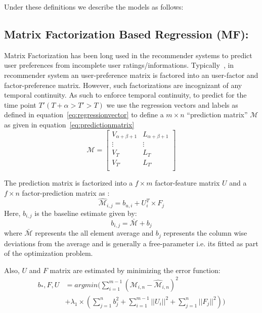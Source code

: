 Under these definitions we describe the models as follows:
\subsection{\label{sec:model:matrixfactor} Matrix Factorization Based Regression (MF):}
Matrix Factorization has been long used in the recommender systems to predict user 
preferences from incomplete user ratings/informations. Typically~\cite{canny2002factor},
in recommender system an user-preference matrix is factored into an user-factor and
factor-preference matrix. However, such factorizations are incognizant of any 
temporal continuity. As such to enforce temporal continuity, to predict for the time point 
$T' (T +\alpha > T' > T)$ we use the regression vectors 
and labels as defined in equation~\ref{eq:regressionvector} to define a $m \times n$ ``prediction
matrix'' $\mathcal{M}$ as given in equation~\ref{eq:predictionmatrix} 
\begin{equation}
  \label{eq:predictionmatrix}
\mathcal{M} = \left[\begin{array}{ll}
              V_{\alpha + \beta + 1} & L_{\alpha+\beta + 1} \\
                              \vdots & \vdots \\
                               V_{T} & L_T \\
                               V_{T'} & L_{T'} \\ 
    \end{array}
  \right]
\end{equation}

The prediction matrix is factorized into a $f\times m$ factor-feature matrix $U$ and 
a $f\times n$ factor-prediction matrix as :
\[ \widehat{\mathcal{M}}_{i,j} = b_{u,i} + U^T_i \times F_j\]
Here, $b_{i,j}$ is the baseline estimate given by:
 \begin{equation}
   \label{eq:baseline}
   b_{i,j} = \bar{\mathcal{M}} + b_j 
 \end{equation}
 where $\bar{\mathcal{M}}$ represents the all element average and $b_j$ represents 
 the column wise deviations from the average and is generally a free-parameter i.e.
 its fitted as part of the optimization problem.

 Also, $U$ and $F$ matrix are estimated by minimizing the error function:
\begin{equation}
  \begin{array}{ll}
  \label{eq:matrix:fit}
  b_*, F, U  & =  argmin (\sum \limits_{i=1}^{m-1} \left(\mathcal{M}_{i,n}  - \widehat{\mathcal{M}}_{i,n} \right)^2 \\ 
  & + \lambda_1\times(\sum \limits_{j=1}^{n}b_j^2 + \sum \limits_{i=1}^{m-1} || U_i||^2 + \sum \limits_{j=1}^{n} || F_j||^2))
\end{array}
\end{equation}


